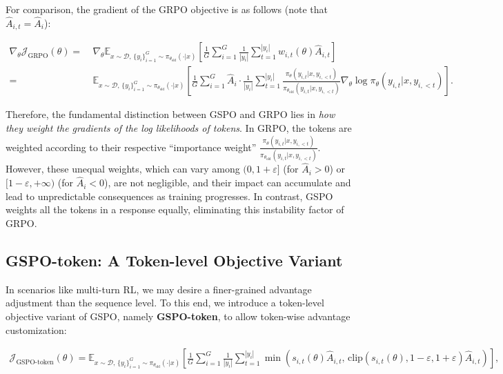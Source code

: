 For comparison, the gradient of the GRPO objective is as follows (note that $\widehat{A}_{i,t} = \widehat{A}_{i}$):

\begin{align}
\nabla_{\theta} \mathcal{J}_\text{GRPO} (\theta) 
=&\ 
\nabla_{\theta} \mathbb{E}_{ x \sim \mathcal{D},\, \{y_i\}_{i=1}^G \sim \pi_{\theta_\text{old}}( \cdot | x) }
\left[ \frac{1}{G} \sum_{i=1}^{G} \frac{1}{|y_i|} \sum_{t=1}^{|y_i|} 
w_{i,t}(\theta) \widehat{A}_{i,t}
\right] \\
=&\
\mathbb{E}_{ x \sim \mathcal{D},\, \{y_i\}_{i=1}^G \sim \pi_{\theta_\text{old}}( \cdot | x) }
\left[ \frac{1}{G} \sum_{i=1}^{G} \widehat{A}_{i} 
\cdot \frac{1}{|y_i|} \sum_{t=1}^{|y_i|} 
\frac{ \pi_{\theta} (y_{i,t} | x, y_{i,<t}) }{ \pi_{\theta_\text{old}} (y_{i,t} | x,y_{i,<t})} 
\nabla_{\theta} \log \pi_{\theta} (y_{i,t} | x, y_{i,<t})  
\right].
\end{align}

Therefore, the fundamental distinction between GSPO and GRPO lies in \textit{how they weight the gradients of the log likelihoods of tokens}. In GRPO, the tokens are weighted according to their respective ``importance weight'' $\frac{ \pi_{\theta} (y_{i,t} | x, y_{i,<t}) }{ \pi_{\theta_\text{old}} (y_{i,t} | x,y_{i,<t})}$. However, these unequal weights, which can vary among $(0, 1+\varepsilon]$ (for $\widehat{A}_{i} >0$) or $[1-\varepsilon, +\infty)$ (for $\widehat{A}_{i} < 0$), are not negligible, and their impact can accumulate and lead to unpredictable consequences as training progresses. In contrast, GSPO weights all the tokens in a response equally, eliminating this instability factor of GRPO.

\subsection{GSPO-token: A Token-level Objective Variant}

In scenarios like multi-turn RL, we may desire a finer-grained advantage adjustment than the sequence level. To this end, we introduce a token-level objective variant of GSPO, namely \textbf{GSPO-token}, to allow token-wise advantage customization:

\begin{align}
\mathcal{J}_\text{GSPO-token}(\theta)
=
\mathbb{E}_{ x \sim \mathcal{D},\, \{y_i\}_{i=1}^G \sim \pi_{\theta_\text{old}}( \cdot | x) }
\left[ 
\frac{1}{G} \sum_{i=1}^{G} \frac{1}{|y_i|} \sum_{t=1}^{|y_i|} 
\min \left( s_{i,t}(\theta) \widehat{A}_{i,t},  \, \mathrm{clip} \left( s_{i,t}(\theta), 1 - {\varepsilon}, 1 + {\varepsilon} \right) \widehat{A}_{i,t} \right) 
\right],
\label{equ:gspo-token}
\end{align}

